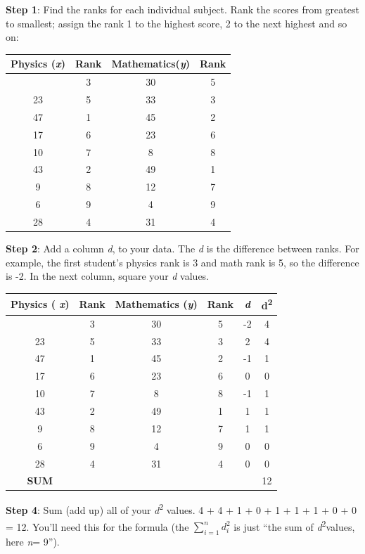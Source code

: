 \documentclass[
]{book}
\begin{document}
\textbf{Step 1}: Find the ranks for each individual subject. Rank the scores
from greatest to smallest; assign the rank 1 to the highest score, 2 to
the next highest and so on:

\begin{longtable}[]{@{}cccc@{}}
\toprule\noalign{}
Physics (\emph{x}) & Rank & Mathematics(\emph{y}) & Rank \\
\midrule\noalign{}
\endhead
\bottomrule\noalign{}
\endlastfoot
35 & 3 & 30 & 5 \\
23 & 5 & 33 & 3 \\
47 & 1 & 45 & 2 \\
17 & 6 & 23 & 6 \\
10 & 7 & 8 & 8 \\
43 & 2 & 49 & 1 \\
9 & 8 & 12 & 7 \\
6 & 9 & 4 & 9 \\
28 & 4 & 31 & 4 \\
\end{longtable}

\textbf{Step 2}: Add a column \emph{d}, to your data. The \emph{d} is the difference
between ranks. For example, the first student's physics rank is 3 and
math rank is 5, so the difference is -2. In the next column, square your
\emph{d} values.

\begin{longtable}[]{@{}cccccc@{}}
\toprule\noalign{}
Physics ( \emph{x}) & Rank & Mathematics (\emph{y}) & Rank & \emph{d} & d\textsuperscript{2} \\
\midrule\noalign{}
\endhead
\bottomrule\noalign{}
\endlastfoot
35 & 3 & 30 & 5 & -2 & 4 \\
23 & 5 & 33 & 3 & 2 & 4 \\
47 & 1 & 45 & 2 & -1 & 1 \\
17 & 6 & 23 & 6 & 0 & 0 \\
10 & 7 & 8 & 8 & -1 & 1 \\
43 & 2 & 49 & 1 & 1 & 1 \\
9 & 8 & 12 & 7 & 1 & 1 \\
6 & 9 & 4 & 9 & 0 & 0 \\
28 & 4 & 31 & 4 & 0 & 0 \\
\textbf{SUM} & & & & & 12 \\
\end{longtable}

\textbf{Step 4}: Sum (add up) all of your \emph{d}\textsuperscript{2} values. 4 + 4 + 1 + 0 + 1 +
1 + 1 + 0 + 0 = 12. You'll need this for the formula (the
\(\sum_{i = 1}^{n}d_{i}^{2}\) is just ``the sum of \emph{d}\textsuperscript{2}values, here \emph{n}=
9'').
\end{document}
